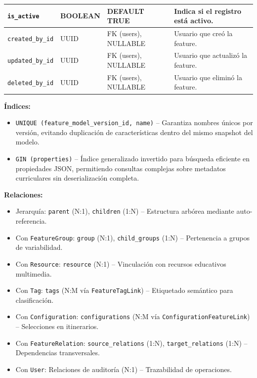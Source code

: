{{{\begin{longtable}{|p{}|p{}|p{}|p{}|}
                \hline
                \rowcolor[HTML]{EDEBF1}
                \texttt{is\_active} & BOOLEAN & DEFAULT TRUE & Indica si el registro está activo. \\
                \hline
                \texttt{created\_by\_id} & UUID & FK (users), NULLABLE & Usuario que creó la feature. \\
                \hline
                \rowcolor[HTML]{EDEBF1}
                \texttt{updated\_by\_id} & UUID & FK (users), NULLABLE & Usuario que actualizó la feature. \\
                \hline
                \texttt{deleted\_by\_id} & UUID & FK (users), NULLABLE & Usuario que eliminó la feature. \\
                \hline
            \end{longtable}

            \textbf{Índices:}
            \begin{itemize}
                \item \texttt{UNIQUE (feature\_model\_version\_id, name)} -- Garantiza nombres únicos por versión, evitando duplicación de características dentro del mismo snapshot del modelo.
                \item \texttt{GIN (properties)} -- Índice generalizado invertido para búsqueda eficiente en propiedades \ac{JSON}, permitiendo consultas complejas sobre metadatos curriculares sin deserialización completa.
            \end{itemize}

            \textbf{Relaciones:}
            \begin{itemize}
                \item Jerarquía: \texttt{parent} (N:1), \texttt{children} (1:N) -- Estructura arbórea mediante auto-referencia.
                \item Con \texttt{FeatureGroup}: \texttt{group} (N:1), \texttt{child\_groups} (1:N) -- Pertenencia a grupos de variabilidad.
                \item Con \texttt{Resource}: \texttt{resource} (N:1) -- Vinculación con recursos educativos multimedia.
                \item Con \texttt{Tag}: \texttt{tags} (N:M vía \texttt{FeatureTagLink}) -- Etiquetado semántico para clasificación.
                \item Con \texttt{Configuration}: \texttt{configurations} (N:M vía \texttt{ConfigurationFeatureLink}) -- Selecciones en itinerarios.
                \item Con \texttt{FeatureRelation}: \texttt{source\_relations} (1:N), \texttt{target\_relations} (1:N) -- Dependencias transversales.
                \item Con \texttt{User}: Relaciones de auditoría (N:1) -- Trazabilidad de operaciones.
            \end{itemize}

}}}
